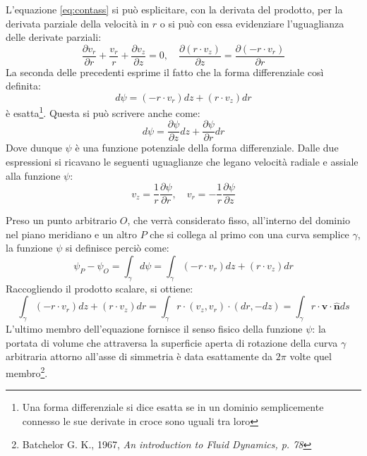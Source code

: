 \documentclass{tufte-handout}
\newcommand{\vect}[1]{\pmb{#1}}
\newcommand{\de}[2]{\dfrac{\partial #1}{\partial #2}}
\begin{document}
L'equazione \ref{eq:contass} si può esplicitare, con la derivata del prodotto, per la derivata parziale della velocità in $r$
o si può con essa evidenziare l'uguaglianza delle derivate parziali:
\begin{equation}
    \frac{\partial v_r}{\partial r}
    +
    \frac{v_r}{r}
    +
    \frac{\partial v_z}{\partial z} = 0,
    \quad
    \frac{\partial (r \cdot v_z)}{\partial z}
    =
    \frac{\partial (-r \cdot v_r)}{\partial r}
    \label{eq:contespl}
\end{equation}
La seconda delle precedenti esprime il fatto che la forma differenziale così definita:
\begin{equation}
    d\psi = (-r \cdot v_r) dz + (r \cdot v_z) dr
\end{equation}
è esatta\footnote{Una forma differenziale si dice esatta se in un dominio semplicemente connesso
le sue derivate in croce sono uguali tra loro}.
Questa si può scrivere anche come:
\begin{equation*}
    d\psi = \de{\psi}{z} dz + \de{\psi}{r} dr
\end{equation*}
Dove dunque $\psi$ è una funzione potenziale della forma differenziale.
Dalle due espressioni si ricavano le seguenti uguaglianze che legano velocità radiale e assiale alla funzione $\psi$:
\begin{equation}
    v_z = \frac{1}{r} \de{\psi}{r},
    \quad
    v_r = -\frac{1}{r} \de{\psi}{z}
    \label{eq:velcor}
\end{equation}

Preso un punto arbitrario $O$, che verrà considerato fisso, all'interno del dominio nel piano meridiano e un altro $P$ che si collega al primo con una curva semplice $\gamma$, la funzione $\psi$ si definisce perciò come:
\begin{equation*}
    \psi_P - \psi_O = \int_\gamma d\psi
    = \int_\gamma (-r \cdot v_r) dz + (r \cdot v_z) dr
\end{equation*}
Raccogliendo il prodotto scalare, si ottiene:
\begin{equation*}
    \int_\gamma (-r \cdot v_r) dz + (r \cdot v_z) dr
    = \int_\gamma r\cdot(v_z, v_r)\cdot (dr, -dz)
    = \int_\gamma r \cdot \vect{v} \cdot \vect{\hat{n}} ds
\end{equation*}
L'ultimo membro dell'equazione fornisce il senso fisico della funzione $\psi$: la portata di volume che attraversa la superficie aperta di rotazione della curva $\gamma$ arbitraria attorno all'asse di simmetria è data esattamente da $2\pi$ volte quel membro\footnote{Batchelor G. K., 1967, \emph{An introduction to Fluid Dynamics, p. 78}}.
\end{document}

